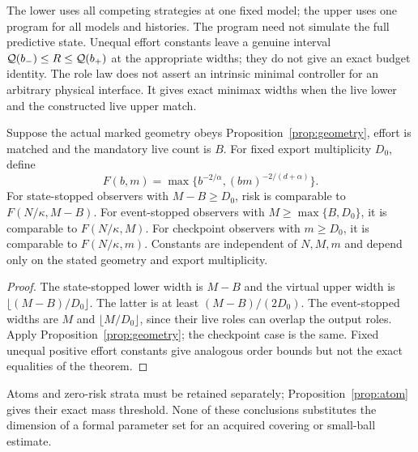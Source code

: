The lower uses all competing strategies at one fixed model; the upper uses one program for all models and histories. The program need not simulate the full predictive state. Unequal effort constants leave a genuine interval $\mathcal Q(b_-)\le R\le\mathcal Q(b_+)$ at the appropriate widths; they do not give an exact budget identity. The role law does not assert an intrinsic minimal controller for an arbitrary physical interface. It gives exact minimax widths when the live lower and the constructed live upper match.

\begin{corollary}\label{cor:order}
Suppose the actual marked geometry obeys Proposition~\ref{prop:geometry}, effort is matched and the mandatory live count is $B$. For fixed export multiplicity $D_0$, define
\[
 F(b,m)=\max\{b^{-2/\alpha},(bm)^{-2/(d+\alpha)}\}.
\]
For state-stopped observers with $M-B\ge D_0$, risk is comparable to $F(N/\kappa,M-B)$. For event-stopped observers with $M\ge\max\{B,D_0\}$, it is comparable to $F(N/\kappa,M)$. For checkpoint observers with $m\ge D_0$, it is comparable to $F(N/\kappa,m)$. Constants are independent of $N,M,m$ and depend only on the stated geometry and export multiplicity.
\end{corollary}
\begin{proof}
The state-stopped lower width is $M-B$ and the virtual upper width is $\lfloor(M-B)/D_0\rfloor$. The latter is at least $(M-B)/(2D_0)$. The event-stopped widths are $M$ and $\lfloor M/D_0\rfloor$, since their live roles can overlap the output roles. Apply Proposition~\ref{prop:geometry}; the checkpoint case is the same. Fixed unequal positive effort constants give analogous order bounds but not the exact equalities of the theorem.
\end{proof}

Atoms and zero-risk strata must be retained separately; Proposition~\ref{prop:atom} gives their exact mass threshold. None of these conclusions substitutes the dimension of a formal parameter set for an acquired covering or small-ball estimate.
